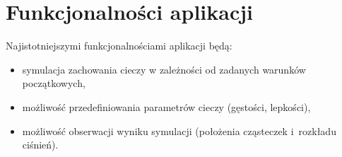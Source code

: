 
\section{Funkcjonalności aplikacji}
Najistotniejszymi funkcjonalnościami aplikacji będą:
\begin{itemize}
    \item symulacja zachowania cieczy w zależności od zadanych warunków początkowych,
    \item możliwość przedefiniowania parametrów cieczy (gęstości, lepkości),
    \item możliwość obserwacji wyniku symulacji (położenia cząsteczek i~rozkładu ciśnień).
\end{itemize}
